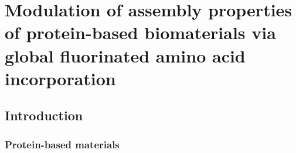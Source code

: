 \chapter{Modulation of assembly properties of protein-based biomaterials via
global fluorinated amino acid incorporation}
\label{chap:pff}

\begin{refsection}

\section{Introduction}

\subsection{Protein-based materials}



\end{refsection}
